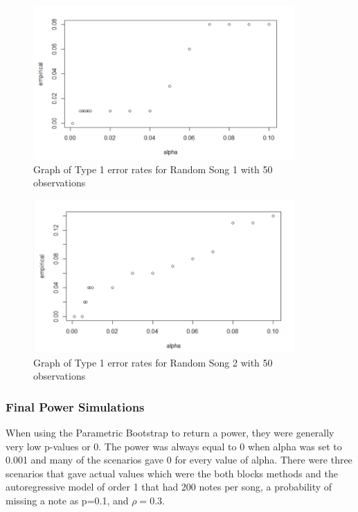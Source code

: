 \documentclass[12pt, letterpaper]{article}
\begin{document}
\begin{figure}[!hb]
\centering
\includegraphics[width=10cm]{Type1_Song1.png}
\caption{Graph of Type 1 error rates for Random Song 1 with 50 observations}
\label{fig: Type 1 Error, Song 1, n=50}
\end{figure}

\begin{figure}[!hb]
\centering
\includegraphics[width=10cm]{Type1_Song2.png}
\caption{Graph of Type 1 error rates for Random Song 2 with 50 observations}
\label{fig: Type 1 Error, Song 2, n=50}
\end{figure}


\subsubsection{Final Power Simulations}
When using the Parametric Bootstrap to return a power, they were generally very low p-values or 0.  The power was always equal to 0 when alpha was set to 0.001 and many of the scenarios gave 0 for every value of alpha.  There were three scenarios that gave actual values which were the both blocks methods and the autoregressive model of order 1 that had 200 notes per song, a probability of missing a note as p=0.1, and $\rho = 0.3$. \\
\end{document}
